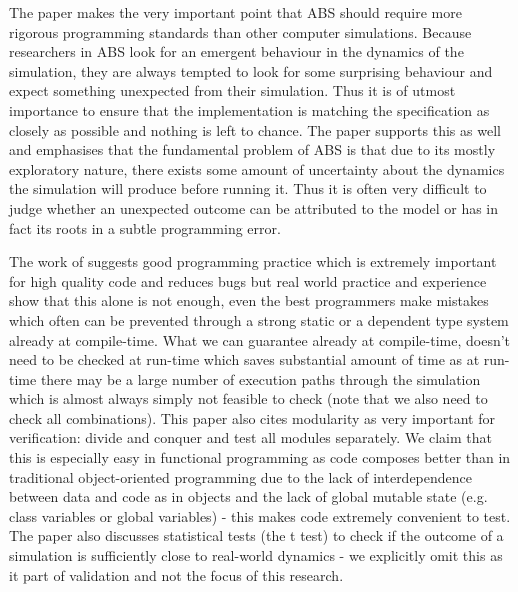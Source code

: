 The paper \cite{polhill_ghost_2005} makes the very important point that ABS should require more rigorous programming standards than other computer simulations. Because researchers in ABS look for an emergent behaviour in the dynamics of the simulation, they are always tempted to look for some surprising behaviour and expect something unexpected from their simulation. Thus it is of utmost importance to ensure that the implementation is matching the specification as closely as possible and nothing is left to chance. The paper \cite{galan_errors_2009} supports this as well and emphasises that the fundamental problem of ABS is that due to its mostly exploratory nature, there exists some amount of uncertainty about the dynamics the simulation will produce before running it. Thus it is often very difficult to judge whether an unexpected outcome can be attributed to the model or has in fact its roots in a subtle programming error.

The work of \cite{kleijnen_verification_1995} suggests good programming practice which is extremely important for high quality code and reduces bugs but real world practice and experience show that this alone is not enough, even the best programmers make mistakes which often can be prevented through a strong static or a dependent type system already at compile-time. What we can guarantee already at compile-time, doesn't need to be checked at run-time which saves substantial amount of time as at run-time there may be a large number of execution paths through the simulation which is almost always simply not feasible to check (note that we also need to check all combinations). This paper also cites modularity as very important for verification: divide and conquer and test all modules separately. We claim that this is especially easy in functional programming as code composes better than in traditional object-oriented programming due to the lack of interdependence between data and code as in objects and the lack of global mutable state (e.g. class variables or global variables) - this makes code extremely convenient to test. The paper also discusses statistical tests (the t test) to check if the outcome of a simulation is sufficiently close to real-world dynamics - we explicitly omit this as it part of validation and not the focus of this research.

